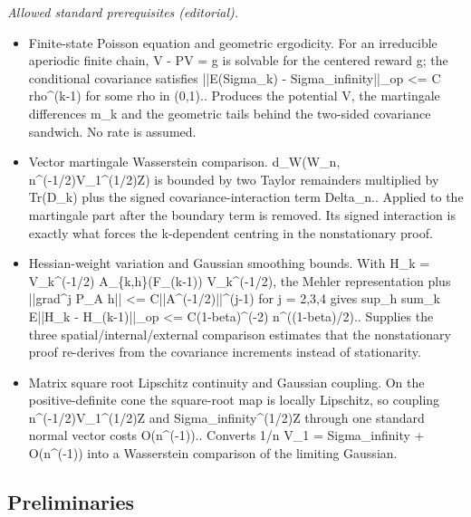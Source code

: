 \documentclass[10pt,a4paper]{article}
\begin{document}
\noindent\textit{Allowed standard prerequisites (editorial).}\begin{itemize}
\item Finite-state Poisson equation and geometric ergodicity. For an irreducible aperiodic finite chain, V - PV = g is solvable for the centered reward g; the conditional covariance satisfies ||E(Sigma\_k) - Sigma\_infinity||\_op <= C rho\textasciicircum{}(k-1) for some rho in (0,1).. Produces the potential V, the martingale differences m\_k and the geometric tails behind the two-sided covariance sandwich. No rate is assumed.
\item Vector martingale Wasserstein comparison. d\_W(W\_n, n\textasciicircum{}(-1/2)V\_1\textasciicircum{}(1/2)Z) is bounded by two Taylor remainders multiplied by Tr(D\_k) plus the signed covariance-interaction term Delta\_n.. Applied to the martingale part after the boundary term is removed. Its signed interaction is exactly what forces the k-dependent centring in the nonstationary proof.
\item Hessian-weight variation and Gaussian smoothing bounds. With H\_k = V\_k\textasciicircum{}(-1/2) A\_\{k,h\}(F\_(k-1)) V\_k\textasciicircum{}(-1/2), the Mehler representation plus ||grad\textasciicircum{}j P\_A h|| <= C||A\textasciicircum{}(-1/2)||\textasciicircum{}(j-1) for j = 2,3,4 gives sup\_h sum\_k E||H\_k - H\_(k-1)||\_op <= C(1-beta)\textasciicircum{}(-2) n\textasciicircum{}((1-beta)/2).. Supplies the three spatial/internal/external comparison estimates that the nonstationary proof re-derives from the covariance increments instead of stationarity.
\item Matrix square root Lipschitz continuity and Gaussian coupling. On the positive-definite cone the square-root map is locally Lipschitz, so coupling n\textasciicircum{}(-1/2)V\_1\textasciicircum{}(1/2)Z and Sigma\_infinity\textasciicircum{}(1/2)Z through one standard normal vector costs O(n\textasciicircum{}(-1)).. Converts 1/n V\_1 = Sigma\_infinity + O(n\textasciicircum{}(-1)) into a Wasserstein comparison of the limiting Gaussian.
\end{itemize}\medskip
\subsection{Preliminaries}
\end{document}
